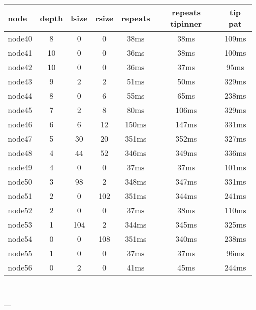 \begin{tabular}{|l|c|c|c|c|c|c|}
\hline node & depth & lsize & rsize  & repeats & repeats tipinner & tip pat\\
    \hline node40 & 8 & 0 & 0 & 38ms & 38ms & 109ms\\
    \hline node41 & 10 & 0 & 0 & 36ms & 38ms & 100ms\\
    \hline node42 & 10 & 0 & 0 & 36ms & 37ms & 95ms\\
    \hline node43 & 9 & 2 & 2 & 51ms & 50ms & 329ms\\
    \hline node44 & 8 & 0 & 6 & 55ms & 65ms & 238ms\\
    \hline node45 & 7 & 2 & 8 & 80ms & 106ms & 329ms\\
    \hline node46 & 6 & 6 & 12 & 150ms & 147ms & 331ms\\
    \hline node47 & 5 & 30 & 20 & 351ms & 352ms & 327ms\\
    \hline node48 & 4 & 44 & 52 & 346ms & 349ms & 336ms\\
    \hline node49 & 4 & 0 & 0 & 37ms & 37ms & 101ms\\
    \hline node50 & 3 & 98 & 2 & 348ms & 347ms & 331ms\\
    \hline node51 & 2 & 0 & 102 & 351ms & 344ms & 241ms\\
    \hline node52 & 2 & 0 & 0 & 37ms & 38ms & 110ms\\
    \hline node53 & 1 & 104 & 2 & 344ms & 345ms & 325ms\\
    \hline node54 & 0 & 0 & 108 & 351ms & 340ms & 238ms\\
    \hline node55 & 1 & 0 & 0 & 37ms & 37ms & 96ms\\
    \hline node56 & 0 & 2 & 0 & 41ms & 45ms & 244ms\\

\hline
\end{tabular} \

---

